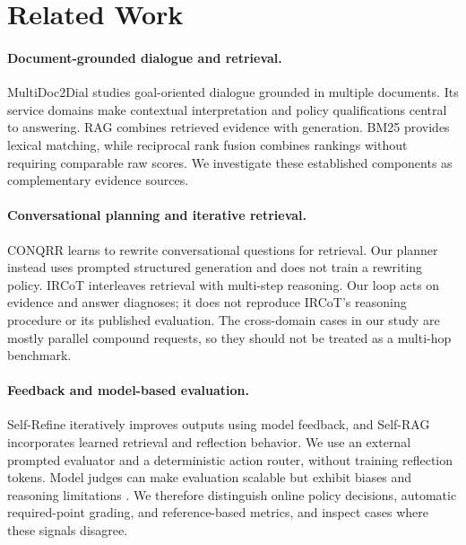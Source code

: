 \section{Related Work}
\paragraph{Document-grounded dialogue and retrieval.}
MultiDoc2Dial \citep{feng2021multidoc2dial} studies goal-oriented dialogue grounded in multiple documents. Its service domains make contextual interpretation and policy qualifications central to answering. RAG \citep{lewis2020rag} combines retrieved evidence with generation. BM25 \citep{robertson2009bm25} provides lexical matching, while reciprocal rank fusion \citep{cormack2009rrf} combines rankings without requiring comparable raw scores. We investigate these established components as complementary evidence sources.

\paragraph{Conversational planning and iterative retrieval.}
CONQRR \citep{wu2022conqrr} learns to rewrite conversational questions for retrieval. Our planner instead uses prompted structured generation and does not train a rewriting policy. IRCoT \citep{trivedi2023ircot} interleaves retrieval with multi-step reasoning. Our loop acts on evidence and answer diagnoses; it does not reproduce IRCoT's reasoning procedure or its published evaluation. The cross-domain cases in our study are mostly parallel compound requests, so they should not be treated as a multi-hop benchmark.

\paragraph{Feedback and model-based evaluation.}
Self-Refine \citep{madaan2023selfrefine} iteratively improves outputs using model feedback, and Self-RAG \citep{asai2024selfrag} incorporates learned retrieval and reflection behavior. We use an external prompted evaluator and a deterministic action router, without training reflection tokens. Model judges can make evaluation scalable but exhibit biases and reasoning limitations \citep{zheng2023judging}. We therefore distinguish online policy decisions, automatic required-point grading, and reference-based metrics, and inspect cases where these signals disagree.
